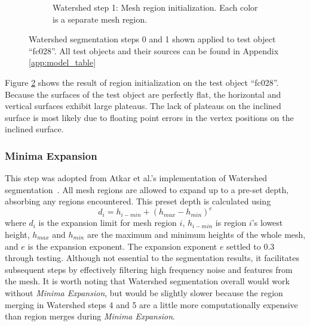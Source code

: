 \begin{figure}[htb]
\begin{subfigure}{0.45\textwidth}
		\caption{Watershed step 1: Mesh region initialization. Each color is a separate mesh region.}
		\label{sfig:ws_1}
	\end{subfigure}
\caption{
Watershed segmentation steps 0 and 1 shown applied to test object ``fc028''.
All test objects and their sources can be found in Appendix \ref{app:model_table}
}
\end{figure}

Figure \ref{sfig:ws_1} shows the result of region initialization on the test object ``fc028''.
Because the surfaces of the test object are perfectly flat, the horizontal and vertical surfaces exhibit large plateaus.
The lack of plateaus on the inclined surface is most likely due to floating point errors in the vertex positions on the inclined surface.

\subsubsection{Minima Expansion}
This step was adopted from Atkar et al.'s implementation of Watershed segmentation~\cite{HierSurfSeg_for_autobody_painting}.
All mesh regions are allowed to expand up to a pre-set depth, absorbing any regions encountered.
This preset depth is calculated using
\begin{equation*}
	d_i = h_{i-min} + \left(h_{max} - h_{min}\right)^{e}
\end{equation*}
where $d_i$ is the expansion limit for mesh region $i$, $h_{i-min}$ is region $i$'s lowest height, $h_{max}$ and $h_{min}$ are the maximum and minimum heights of the whole mesh, and $e$ is the expansion exponent.
The expansion exponent $e$ settled to 0.3 through testing.
Although not essential to the segmentation results, it facilitates subsequent steps by effectively filtering high frequency noise and features from the mesh.
It is worth noting that Watershed segmentation overall would work without \textit{Minima Expansion}, but would be slightly slower because the region merging in Watershed steps 4 and 5 are a little more computationally expensive than region merges during \textit{Minima Expansion}.

